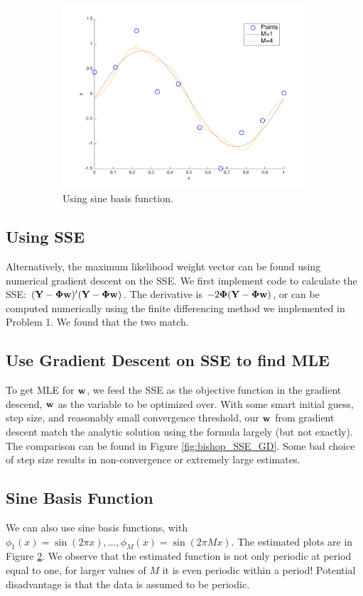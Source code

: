 \begin{figure}[h!]
\begin{subfigure}[b]{0.4\textwidth}
	\includegraphics[scale=0.4]{hw1_2_4.pdf}
	\caption{Using sine basis function.}\label{fig:bishop_sin}
    \end{subfigure}  
    \caption{}    
\end{figure}


\subsection{Using SSE}
Alternatively, the maximum likelihood weight vector can be found using numerical gradient descent on the SSE. We first implement code to calculate the SSE: $(\boldsymbol{\mathbf{Y}} - \boldsymbol{\mathbf{\Phi}} \boldsymbol{\mathbf{w}})'(\boldsymbol{\mathbf{Y}} - \boldsymbol{\mathbf{\Phi}} \boldsymbol{\mathbf{w}})$. The derivative is $-2\boldsymbol{\mathbf{\Phi}} (\boldsymbol{\mathbf{Y}} - \boldsymbol{\mathbf{\Phi}} \boldsymbol{\mathbf{w}})$, or can be computed numerically using the finite differencing method we implemented in Problem 1. We found that the two match.

\subsection{Use Gradient Descent on SSE to find MLE}
To get MLE for $\boldsymbol{\mathbf{w}}$, we feed the SSE as the objective function in the gradient descend, $\boldsymbol{\mathbf{w}}$ as the variable to be optimized over. With some smart initial guess, step size, and reasonably small convergence threshold, our $\boldsymbol{\mathbf{w}}$ from gradient descent match the analytic solution using the formula largely (but not exactly). The comparison can be found in Figure \ref{fig:bishop_SSE_GD}. Some bad choice of step size results in non-convergence or extremely large estimates.   


\subsection{Sine Basis Function}
We can also use sine basis functions, with $\phi_1(x) = \sin(2\pi x), \ldots, \phi_M(x) = \sin(2\pi Mx)$. The estimated plots are in Figure \ref{fig:bishop_sin}. We observe that the estimated function is not only periodic at period equal to one, for larger values of $M$ it is even periodic within a period! Potential disadvantage is that the data is assumed to be periodic.

